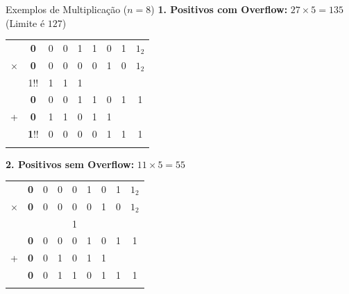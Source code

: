 \begin{frame}{Exemplos de Multiplicação ($n=8$)}
    \footnotesize
    \textbf{1. Positivos com Overflow:} $27 \times 5 = 135$ (Limite é $127$)
    \begin{tabular}{ccccccccc}
                 & {\bf 0}                         & 0                             & 0                             & 1                             & 1 & 0 & 1 & $1_2$ \\
        $\times$ & {\bf 0}                         & 0                             & 0                             & 0                             & 0 & 1 & 0 & $1_2$ \\
        \hline
                 & {\footnotesize  \color{red}1}!! & {\footnotesize  \color{red}1} & {\footnotesize  \color{red}1} & {\footnotesize  \color{red}1} &   &   &   &       \\
                 & {\bf 0}                         & 0                             & 0                             & 1                             & 1 & 0 & 1 & 1     \\
        +        & {\bf 0}                         & 1                             & 1                             & 0                             & 1 & 1 &   &       \\
        \hline
                 & {\bf 1}!!                       & 0                             & 0                             & 0                             & 0 & 1 & 1 & 1     \\
        \\
    \end{tabular}

    \textbf{2. Positivos sem Overflow:} $11 \times 5 = 55$

    \begin{tabular}{ccccccccc}
                 & {\bf 0} & 0 & 0 & 0                             & 1 & 0 & 1 & $1_2$ \\
        $\times$ & {\bf 0} & 0 & 0 & 0                             & 0 & 1 & 0 & $1_2$ \\
        \hline
                 &         &   &   & {\footnotesize  \color{red}1} &   &   &   &       \\
                 & {\bf 0} & 0 & 0 & 0                             & 1 & 0 & 1 & 1     \\
        +        & {\bf 0} & 0 & 1 & 0                             & 1 & 1 &   &       \\
        \hline
                 & {\bf 0} & 0 & 1 & 1                             & 0 & 1 & 1 & 1     \\
        \\
    \end{tabular}
\end{frame}


